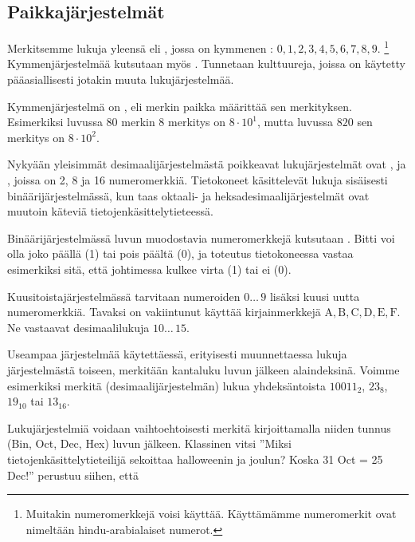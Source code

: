 \subsection*{Paikkajärjestelmät}

Merkitsemme lukuja yleensä  eli , jossa on kymmenen :
$0, 1, 2, 3, 4, 5, 6, 7, 8, 9$.
\footnote{Muitakin numeromerkkejä voisi käyttää. Käyttämämme numeromerkit ovat nimeltään hindu-arabialaiset numerot.}
Kymmenjärjestelmää kutsutaan myös .
Tunnetaan kulttuureja, joissa on käytetty pääasiallisesti jotakin muuta lukujärjestelmää.

Kymmenjärjestelmä on , eli merkin paikka määrittää sen merkityksen.
Esimerkiksi luvussa $80$ merkin 8 merkitys on $8 \cdot 10^1$, mutta luvussa $820$ sen merkitys on $8 \cdot 10^2$.

Nykyään yleisimmät desimaalijärjestelmästä poikkeavat lukujärjestelmät ovat ,
 ja , joissa on 2, 8 ja 16 numeromerkkiä.
Tietokoneet käsittelevät lukuja sisäisesti binäärijärjestelmässä, kun taas oktaali- ja heksadesimaalijärjestelmät ovat muutoin käteviä tietojenkäsittelytieteessä.

Binäärijärjestelmässä luvun muodostavia numeromerkkejä kutsutaan .
Bitti voi olla joko päällä (1) tai pois päältä (0), ja toteutus tietokoneessa vastaa esimerkiksi sitä, että johtimessa kulkee virta (1) tai ei (0).

Kuusitoistajärjestelmässä tarvitaan numeroiden $0 \ldots \, 9$ lisäksi kuusi uutta numeromerkkiä.
Tavaksi on vakiintunut käyttää kirjainmerkkejä $\mathrm{A, B, C, D, E, F}$. Ne vastaavat desimaalilukuja $10 \ldots \, 15$.

Useampaa järjestelmää käytettäessä, erityisesti muunnettaessa lukuja järjestelmästä toiseen, merkitään kantaluku luvun jälkeen alaindeksinä.
Voimme esimerkiksi merkitä (desimaalijärjestelmän) lukua yhdeksäntoista $10011_{2}$, $23_{8}$, $19_{10}$ tai $13_{16}$.

Lukujärjestelmiä voidaan vaihtoehtoisesti merkitä kirjoittamalla niiden tunnus (Bin, Oct, Dec, Hex) luvun jälkeen.
Klassinen vitsi ''Miksi tietojenkäsittelytieteilijä sekoittaa halloweenin ja joulun? Koska 31 Oct = 25 Dec!'' perustuu siihen, että


